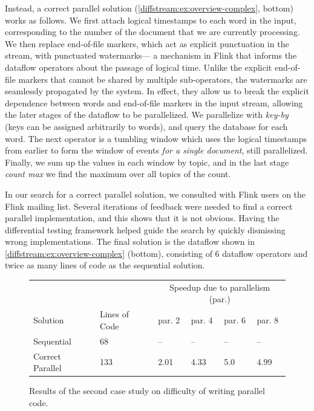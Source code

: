 Instead, a correct parallel solution (\cref{diffstream:ex:overview-complex}, bottom) works as follows. We first attach logical timestamps to each word in the input, corresponding to the number of the document that we are currently processing.
We then replace end-of-file markers,
which act as explicit punctuation in the stream, with punctuated watermarks---%
a mechanism in Flink that
informs the dataflow operators about the
passage of logical time. Unlike the explicit end-of-file markers that cannot
be shared by multiple sub-operators, the watermarks are seamlessly propagated
by the system. In effect, they allow us to break the explicit dependence
between words and end-of-file markers in the input stream, allowing the
later stages of the dataflow to be parallelized. We parallelize with \emph{key-by} (keys can be assigned arbitrarily to words), and query the database for each word. The next operator is a tumbling window which uses the logical timestamps from earlier to form the window of events \emph{for a single document}, still parallelized. Finally, we sum up the values in each window by topic, and in the last stage \emph{count max} we find the maximum over all topics of the count.

In our search for a correct parallel solution, we consulted with Flink users
on the Flink mailing list. Several iterations of feedback were needed to find a correct parallel implementation, and this shows that it is not obvious. Having the differential testing framework helped guide the search by quickly dismissing wrong implementations. The final solution is the
dataflow shown in \cref{diffstream:ex:overview-complex} (bottom), consisting of 6
dataflow operators and twice as many lines of code as the sequential solution.

\begin{figure}[t]
  \centering
    \begin{tabular}{p{2.8cm} | p{2.5cm} | p{1.4cm}p{1.4cm}p{1.4cm}p{1.4cm}}
    & & \multicolumn{4}{c}{{Speedup due to parallelism (par.)}} \\
    Solution & Lines of Code & par. 2 & par. 4 & par. 6 & par. 8 \\
    \hline
    Sequential & 68 & -- & -- & -- & -- \\
    Correct Parallel & 133 & 2.01 & 4.33 & 5.0 & 4.99 \\
    \end{tabular}

  \bigskip

\caption{Results of the second case study on difficulty of writing parallel code.}
\label{diffstream:fig:word-count-evaluation}
\end{figure}

